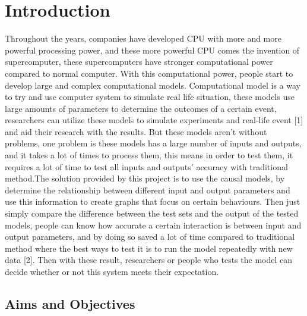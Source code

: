 \chapter{Introduction}

Throughout the years, companies have developed CPU with more and more powerful processing power, and these more powerful CPU comes the invention of supercomputer, these supercomputers have stronger computational power compared to normal computer. With this computational power, people start to develop large and complex computational models. Computational model is a way to try and use computer system to simulate real life situation, these models use large amounts of parameters to determine the outcomes of a certain event, researchers can utilize these models to simulate experiments and real-life event [1] and aid their research with the results.
But these models aren’t without problems, one problem is these models has a large number of inputs and outputs, and it takes a lot of times to process them, this means in order to test them, it requires a lot of time to test all inputs and outputs’ accuracy with traditional method.The solution provided by this project is to use the causal models, by determine the relationship between different input and output parameters and use this information to create graphs that focus on certain behaviours. Then just simply compare the difference between the test sets and the output of the tested models, people can know how accurate a certain interaction is between input and output parameters, and by doing so saved a lot of time compared to traditional method where the best ways to test it is to run the model repeatedly with new data [2]. Then with these result, researchers or people who tests the model can decide whether or not this system meets their expectation.  


\section{Aims and Objectives}

